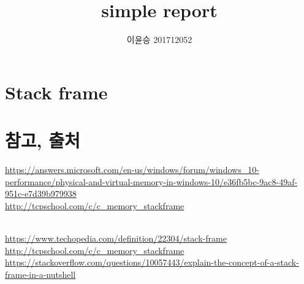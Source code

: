 \documentclass{oblivoir}
\begin{document}
\title{simple report}
\author{이윤승 201712052}
\maketitle
\tableofcontents
{}


\section{Stack frame}

\section{참고, 출처}

\url{https://answers.microsoft.com/en-us/windows/forum/windows_10-performance/physical-and-virtual-memory-in-windows-10/e36fb5bc-9ac8-49af-951c-e7d39b979938} 
\\ \url{http://tcpschool.com/c/c_memory_stackframe}

\\ \url{https://www.techopedia.com/definition/22304/stack-frame}
\\ \url{http://tcpschool.com/c/c_memory_stackframe}
\\ \url{https://stackoverflow.com/questions/10057443/explain-the-concept-of-a-stack-frame-in-a-nutshell}
\end{document}
